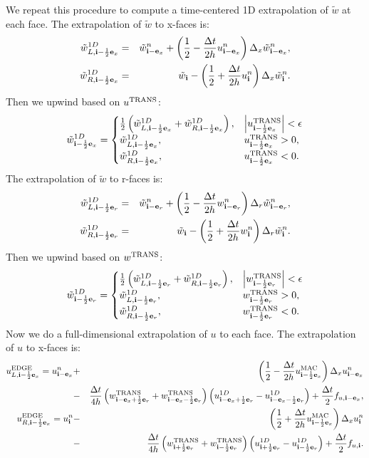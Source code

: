 \documentclass[11pt]{article}
\def\half  {\frac{1}{2}}
\def\dt    {\Delta t}
\def\edge  {\rm EDGE}
\def\mac   {\rm MAC}
\def\trans {\rm TRANS}
\def\eb    {{\bf e}}
\def\ib    {{\bf i}}
\def\wt    {\tilde{w}}
\begin{document}
We repeat this procedure to compute a time-centered 1D extrapolation of $\wt$ at each face.  The extrapolation of $\wt$ to x-faces is:
\begin{eqnarray}
\wt_{L,\ib-\half\eb_x}^{1D} &=& \wt_{\ib-\eb_x}^n + \left(\half - \frac{\dt}{2h}u_{\ib-\eb_x}^n\right)\Delta_x \wt_{\ib-\eb_x}^n, \\
\wt_{R,\ib-\half\eb_x}^{1D} &=& \wt_{\ib} - \left(\half + \frac{\dt}{2h}u_{\ib}^n\right)\Delta_x \wt_{\ib}^n.
\end{eqnarray}
Then we upwind based on $u^{\trans}$:
\begin{equation}
\wt_{\ib-\half\eb_x}^{1D} =
\begin{cases}
\half\left(\wt_{L,\ib-\half\eb_x}^{1D} + \wt_{R,\ib-\half\eb_x}^{1D}\right), & \left|u^{\trans}_{\ib-\half\eb_x}\right| < \epsilon \\
\wt_{L,\ib-\half\eb_x}^{1D}, & u^{\trans}_{\ib-\half\eb_x} > 0, \\
\wt_{R,\ib-\half\eb_x}^{1D}, & u^{\trans}_{\ib-\half\eb_x} < 0. \\
\end{cases}
\end{equation}
The extrapolation of $\wt$ to r-faces is:
\begin{eqnarray}
\wt_{L,\ib-\half\eb_r}^{1D} &=& \wt_{\ib-\eb_r}^n + \left(\half - \frac{\dt}{2h}w_{\ib-\eb_r}^n\right)\Delta_r \wt_{\ib-\eb_r}^n, \label{1D wt_L extrap} \\
\wt_{R,\ib-\half\eb_r}^{1D} &=& \wt_{\ib} - \left(\half + \frac{\dt}{2h}w_{\ib}^n\right)\Delta_r \wt_{\ib}^n. \label{1D wt_R extrap}
\end{eqnarray}
Then we upwind based on $w^{\trans}$:
\begin{equation}
\wt_{\ib-\half\eb_r}^{1D} =
\begin{cases}
\half\left(\wt_{L,\ib-\half\eb_r}^{1D} + \wt_{R,\ib-\half\eb_r}^{1D}\right), & \left|w^{\trans}_{\ib-\half\eb_r}\right| < \epsilon \\
\wt_{L,\ib-\half\eb_r}^{1D}, & w^{\trans}_{\ib-\half\eb_r} > 0, \\
\wt_{R,\ib-\half\eb_r}^{1D}, & w^{\trans}_{\ib-\half\eb_r} < 0. \\
\end{cases}
\end{equation}
Now we do a full-dimensional extrapolation of $u$ to each face.  The extrapolation of $u$ to x-faces is:
\begin{eqnarray}
u_{L,\ib-\half\eb_x}^{\edge} = u_{\ib-\eb_x}^n &+& \left(\half - \frac{\dt}{2h}u_{\ib-\half\eb_x}^{\mac}\right)\Delta_x u_{\ib-\eb_x}^n \nonumber \\
&-& \frac{\dt}{4h}\left(w_{\ib-\eb_x+\half\eb_r}^{\trans}+w_{\ib-\eb_x-\half\eb_r}^{\trans}\right)\left(u_{\ib-\eb_x+\half\eb_r}^{1D} - u_{\ib-\eb_x-\half\eb_r}^{1D}\right) + \frac{\dt}{2}f_{u,\ib-\eb_x}, \\
u_{R,\ib-\half\eb_x}^{\edge} = u_{\ib}^n &-& \left(\half + \frac{\dt}{2h}u_{\ib-\half\eb_x}^{\mac}\right)\Delta_x u_{\ib}^n \nonumber \\
&-& \frac{\dt}{4h}\left(w_{\ib+\half\eb_r}^{\trans}+w_{\ib-\half\eb_r}^{\trans}\right)\left(u_{\ib+\half\eb_r}^{1D} - u_{\ib-\half\eb_r}^{1D}\right) + \frac{\dt}{2}f_{u,\ib}.
\end{eqnarray}
\end{document}
